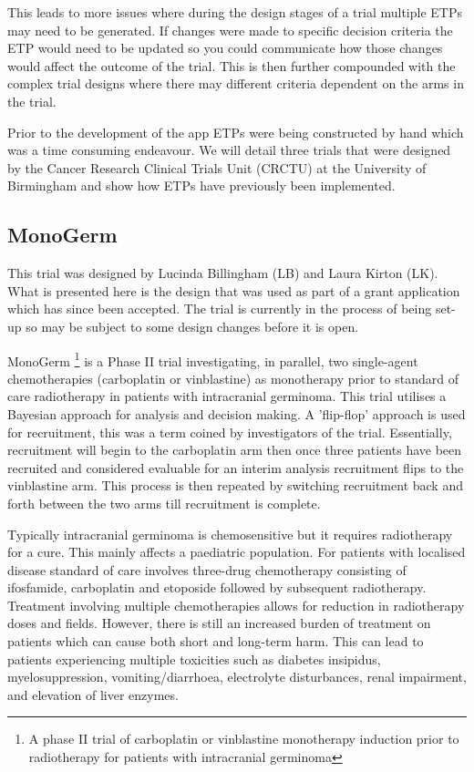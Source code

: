 This leads to more issues where during the design stages of a trial multiple ETPs may need to be generated. If changes were made to specific decision criteria the ETP would need to be updated so you could communicate how those changes would affect the outcome of the trial. This is then further compounded with the complex trial designs where there may different criteria dependent on the arms in the trial.

Prior to the development of the app ETPs were being constructed by hand which was a time consuming endeavour. We will detail three trials that were designed by the Cancer Research Clinical Trials Unit (CRCTU) at the University of Birmingham and show how ETPs have previously been implemented. 


\subsection{MonoGerm} 

This trial was designed by Lucinda Billingham (LB) and Laura Kirton (LK). What is presented here is the design that was used as part of a grant application which has since been accepted. The trial is currently in the process of being set-up so may be subject to some design changes before it is open. 

MonoGerm \footnote{A phase II trial of carboplatin or vinblastine monotherapy induction prior to radiotherapy for patients with intracranial germinoma} is a Phase \RN{2} trial investigating, in parallel, two single-agent chemotherapies (carboplatin or vinblastine) as monotherapy prior to standard of care radiotherapy in patients with intracranial germinoma. This trial utilises a Bayesian approach for analysis and decision making. A 'flip-flop' approach is used for recruitment, this was a term coined by investigators of the trial. Essentially, recruitment will begin to the carboplatin arm then once three patients have been recruited and considered evaluable for an interim analysis recruitment flips to the vinblastine arm. This process is then repeated by switching recruitment back and forth between the two arms till recruitment is complete. 

Typically intracranial germinoma is chemosensitive but it requires radiotherapy for a cure. This mainly affects a paediatric population. For patients with localised disease standard of care involves three-drug chemotherapy consisting of ifosfamide, carboplatin and etoposide followed by subsequent radiotherapy. Treatment involving multiple chemotherapies allows for reduction in radiotherapy doses and fields. However, there is still an increased burden of treatment on patients which can cause both short and long-term harm. This can lead to patients experiencing multiple toxicities such as diabetes insipidus, myelosuppression, vomiting/diarrhoea, electrolyte disturbances, renal impairment, and elevation of liver enzymes. 

